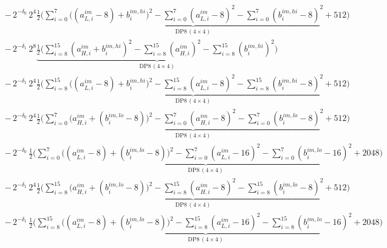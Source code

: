 \documentclass[fleqn]{article}
\newcommand{\DPop}[3]{\mathrm{DP#1}\,(#2\!\times\!#3)}
\begin{document}
\begin{align*}
  & -\, 2^{-\delta_0}\,2^{4}\underbrace{\tfrac12\Big(\sum_{i=0}^{7}\big((a_{L,i}^{im}{-}8){+}b_i^{im,hi}\big)^2 - \sum_{i=0}^{7}(a_{L,i}^{im}{-}8)^2 - \sum_{i=0}^{7}(b_i^{im,hi}{-}8)^2 + 512\Big)}_{\DPop{8}{4}{4}} \\[0.6em]
  & -\, 2^{-\delta_1}\,2^{8}\underbrace{\tfrac12\Big(\sum_{i=8}^{15}(a_{H,i}^{im}{+}b_i^{im,hi})^2 - \sum_{i=8}^{15}(a_{H,i}^{im})^2 - \sum_{i=8}^{15}(b_i^{im,hi})^2\Big)}_{\DPop{8}{4}{4}} \\[0.6em]
  & -\, 2^{-\delta_1}\,2^{4}\underbrace{\tfrac12\Big(\sum_{i=8}^{15}\big((a_{L,i}^{im}{-}8){+}b_i^{im,hi}\big)^2 - \sum_{i=8}^{15}(a_{L,i}^{im}{-}8)^2 - \sum_{i=8}^{15}(b_i^{im,hi}{-}8)^2 + 512\Big)}_{\DPop{8}{4}{4}} \\[0.6em]
  & -\, 2^{-\delta_0}\,2^{4}\underbrace{\tfrac12\Big(\sum_{i=0}^{7}\big(a_{H,i}^{im}{+}(b_i^{im,lo}{-}8)\big)^2 - \sum_{i=0}^{7}(a_{H,i}^{im}{-}8)^2 - \sum_{i=0}^{7}(b_i^{im,lo}{-}8)^2 + 512\Big)}_{\DPop{8}{4}{4}} \\[0.6em]
  & -\, 2^{-\delta_0}\,\underbrace{\tfrac12\Big(\sum_{i=0}^{7}\big((a_{L,i}^{im}{-}8){+}(b_i^{im,lo}{-}8)\big)^2 - \sum_{i=0}^{7}(a_{L,i}^{im}{-}16)^2 - \sum_{i=0}^{7}(b_i^{im,lo}{-}16)^2 + 2048\Big)}_{\DPop{8}{4}{4}} \\[0.6em]
  & -\, 2^{-\delta_1}\,2^{4}\underbrace{\tfrac12\Big(\sum_{i=8}^{15}\big(a_{H,i}^{im}{+}(b_i^{im,lo}{-}8)\big)^2 - \sum_{i=8}^{15}(a_{H,i}^{im}{-}8)^2 - \sum_{i=8}^{15}(b_i^{im,lo}{-}8)^2 + 512\Big)}_{\DPop{8}{4}{4}} \\[0.6em]
  & -\, 2^{-\delta_1}\,\underbrace{\tfrac12\Big(\sum_{i=8}^{15}\big((a_{L,i}^{im}{-}8){+}(b_i^{im,lo}{-}8)\big)^2 - \sum_{i=8}^{15}(a_{L,i}^{im}{-}16)^2 - \sum_{i=8}^{15}(b_i^{im,lo}{-}16)^2 + 2048\Big)}_{\DPop{8}{4}{4}}
\end{align*}
\end{document}
